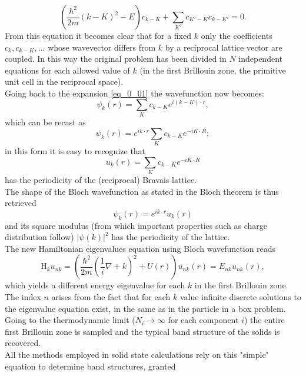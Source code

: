 \documentclass[12pt, a4paper]{report}
\numberwithin{equation}{section}
\begin{document}
\begin{equation}
    \left(\frac{\hbar^2}{2m}(k-K)^2-E\right)c_{k-K}+\sum_{K'}c_{K'-K}c_{k-K'}=0.
\end{equation}
From this equation it becomes clear that for a fixed $k$ only the coefficients $c_k,c_{k-K},...$ whose wavevector differs from 
$k$ by a reciprocal lattice vector are coupled. In this way the original problem has been divided in $N$ independent equations for 
each allowed value of $k$ (in the first Brillouin zone, the primitive unit cell in the reciprocal space).\\
Going back to the expansion \ref{eq_0_01} the wavefunction now becomes:
\begin{equation}
    \psi_k(r)=\sum_{K}c_{k-K}e^{i(k-K)\cdot r},
\end{equation}
which can be recast as 
\begin{equation}
    \psi_k(r)=e^{ik\cdot r}\sum_{K}c_{k-K}e^{-iK\cdot R};
\end{equation}
in this form it is easy to recognize that 
\begin{equation}
    u_k(r)=\sum_Kc_{k-K}e^{-iK\cdot R}
\end{equation}
has the periodicity of the (reciprocal) Bravais lattice.\\
The shape of the Bloch wavefunction as stated in the Bloch theorem is thus retrieved
\begin{equation}
    \psi_k(r)=e^{ik\cdot r}u_k(r)
\end{equation}
and its square modulus (from which important properties such as charge distribution follow) $|\psi(k)|^2$ has the periodicity of the
lattice.\\
The new Hamiltonian eigenvalues equation using Bloch wavefunction reads
\begin{equation}
    \mathrm{H}_k u_{nk}=\left(\frac{\hbar^2}{2m}\left(\frac{1}{i}\nabla+k\right)^2+U(r)\right)u_{nk}(r)=E_{nk}u_{nk}(r),
\end{equation}
which yields a different energy eigenvalue for each $k$ in the first Brillouin zone. The index $n$ arises from the fact that for 
each $k$ value infinite discrete solutions to the eigenvalue equation exist, in the same as in the particle in a box problem. Going 
to the thermodynamic limit ($N_i\to\infty$ for each component $i$) the entire first Brillouin zone is sampled and the typical band 
structure of the solids is recovered.\\
All the methods employed in solid state calculations rely on this "simple" equation to determine band structures, granted 
\end{document}
